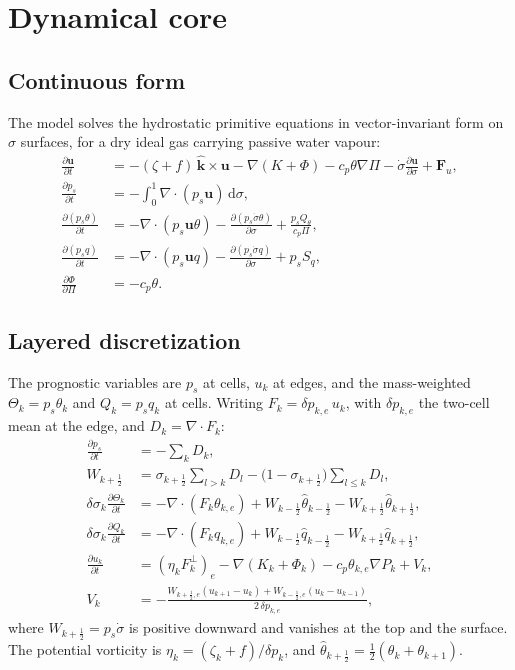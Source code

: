 \documentclass[11pt,a4paper]{article}
\newcommand{\dd}{\mathrm{d}}
\newcommand{\pd}[2]{\frac{\partial #1}{\partial #2}}
\newcommand{\vect}[1]{\bm{#1}}
\newcommand{\kvec}{\hat{\vect{k}}}
\begin{document}
\section{Dynamical core}

\subsection{Continuous form}
The model solves the hydrostatic primitive equations in vector-invariant form on
$\sigma$ surfaces, for a dry ideal gas carrying passive water vapour:
\begin{align}
\pd{\vect{u}}{t} &= -(\zeta + f)\,\kvec\times\vect{u}
  - \nabla(K + \Phi) - c_p\theta\nabla\Pi
  - \dot\sigma\pd{\vect{u}}{\sigma} + \vect{F}_u, \\
\pd{p_s}{t} &= -\int_0^1 \nabla\cdot(p_s\vect{u})\,\dd\sigma, \\
\pd{(p_s\theta)}{t} &= -\nabla\cdot(p_s\vect{u}\theta)
  - \pd{(p_s\dot\sigma\theta)}{\sigma} + \frac{p_s Q_\theta}{c_p\Pi}, \\
\pd{(p_s q)}{t} &= -\nabla\cdot(p_s\vect{u}q)
  - \pd{(p_s\dot\sigma q)}{\sigma} + p_s S_q, \\
\pd{\Phi}{\Pi} &= -c_p\theta .
\end{align}

\subsection{Layered discretization}
The prognostic variables are $p_s$ at cells, $u_{k}$ at edges, and the
mass-weighted $\Theta_k = p_s\theta_k$ and $Q_k = p_s q_k$ at cells. Writing
$F_k = \delta p_{k,e}\,u_k$, with $\delta p_{k,e}$ the two-cell mean at the edge,
and $D_k = \nabla\cdot F_k$:
\begin{align}
\pd{p_s}{t} &= -\sum_k D_k, \\
W_{k+\frac12} &= \sigma_{k+\frac12}\sum_{l>k} D_l
   - \bigl(1-\sigma_{k+\frac12}\bigr)\sum_{l\le k} D_l , \\
\delta\sigma_k\pd{\Theta_k}{t} &= -\nabla\cdot(F_k\theta_{k,e})
   + W_{k-\frac12}\hat\theta_{k-\frac12} - W_{k+\frac12}\hat\theta_{k+\frac12}, \\
\delta\sigma_k\pd{Q_k}{t} &= -\nabla\cdot(F_k q_{k,e})
   + W_{k-\frac12}\hat q_{k-\frac12} - W_{k+\frac12}\hat q_{k+\frac12}, \\
\pd{u_k}{t} &= (\eta_k F_k^\perp)_e - \nabla(K_k + \Phi_k)
   - c_p\theta_{k,e}\nabla P_k + V_k, \\
V_k &= -\frac{W_{k+\frac12,e}(u_{k+1}-u_k) + W_{k-\frac12,e}(u_k-u_{k-1})}
   {2\,\delta p_{k,e}},
\end{align}
where $W_{k+\frac12} = p_s\dot\sigma$ is positive downward and vanishes at the
top and the surface. The potential vorticity is
$\eta_k = (\zeta_k + f)/\delta p_k$, and $\hat\theta_{k+\frac12} =
\tfrac12(\theta_k + \theta_{k+1})$.
\end{document}
